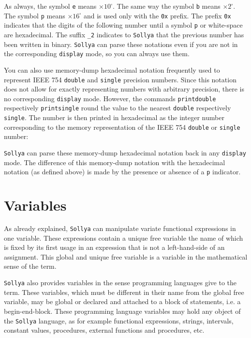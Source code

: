 \documentclass[a4paper]{article}
\newcommand{\com}[1]{\texttt{#1}}
\newcommand{\key}[1]{\texttt{#1}}
\newcommand{\sollya}{\texttt{Sollya}\xspace}
\begin{document}
As always, the symbol \texttt{e} means $\times 10^\square $. The same way the symbol \texttt{b} means  $\times 2^\square $. The symbol \texttt{p} means $\times 16^\square$ and is used only with the \texttt{0x} prefix. The prefix \texttt{0x} indicates that the digits of the following number until 
a symbol \texttt{p} or white-space are hexadecimal. The suffix \texttt{\_2} indicates to \sollya that the previous number has been written in binary. \sollya can parse these notations even if you are not in the corresponding \key{display} mode, so you can always use them.

You can also use memory-dump hexadecimal notation frequently used to represent IEEE 754 \texttt{double} and \texttt{single} precision numbers. Since this notation does not allow for exactly representing numbers with arbitrary precision, there is no corresponding \key{display} mode. However, the commands \com{printdouble} respectively \com{printsingle} round the value to the nearest \texttt{double} respectively \texttt{single}. The number is then printed in hexadecimal as the integer number corresponding to the memory representation of the IEEE 754 \texttt{double} or \texttt{single} number:



\sollya can parse these memory-dump hexadecimal notation back in any
\key{display} mode. The difference of this memory-dump
notation with the hexadecimal notation (as defined above) is made by
the presence or absence of a \texttt{p} indicator.

\section{Variables}\label{variables}

As already explained, \sollya can manipulate variate functional
expressions in one variable. These expressions contain a unique free variable the name
of which is fixed by its first usage in an expression that is not a
left-hand-side of an assignment. This global and unique free variable is 
a variable in the mathematical sense of the term. 

\sollya also provides variables in the sense programming languages
give to the term.  These variables, which must be different in their
name from the global free variable, may be global or declared and
attached to a block of statements, i.e. a begin-end-block. These
programming language variables may hold any object of the \sollya
language, as for example functional expressions, strings, intervals,
constant values, procedures, external functions and procedures, etc.
\end{document}
